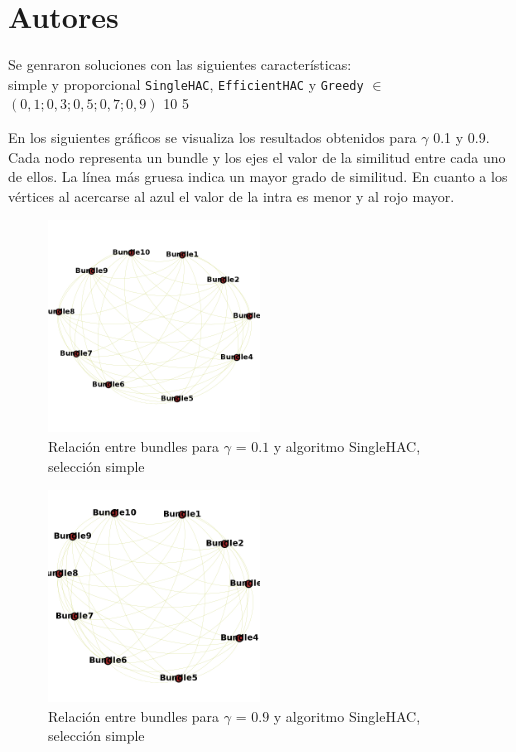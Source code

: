 \section{Autores}
Se genraron soluciones con las siguientes características:\\
\Solucion
{}
{simple y proporcional}
{\texttt{SingleHAC}, \texttt{EfficientHAC} y \texttt{Greedy}}
{$\in$ $(0,1; 0,3; 0,5; 0,7; 0,9)$}
{10}
{5}

En los siguientes gráficos se visualiza los resultados obtenidos para $\gamma$ 0.1 y 0.9. Cada 
nodo representa un bundle y los ejes el valor de la similitud entre cada uno de ellos. La línea más 
gruesa indica un mayor grado de similitud. En cuanto a los vértices al acercarse al azul el valor 
de la intra es menor y al rojo mayor.

\begin{figure}[H]
  \centering
    \includegraphics[width=0.5\textwidth]{resultados/authors/intra_inter/hac01.png}
  \caption{Relación entre bundles para $\gamma$ = $0.1$ y algoritmo SingleHAC, selección simple}
  \label{res:img-authors-gamma01-hac}
\end{figure}

\begin{figure}[H]
  \centering
    \includegraphics[width=0.5\textwidth]{resultados/authors/intra_inter/hac09.png}
  \caption{Relación entre bundles para $\gamma$ = $0.9$ y algoritmo SingleHAC, selección simple}
  \label{res:img-authors-gamma09-hac}
\end{figure}

